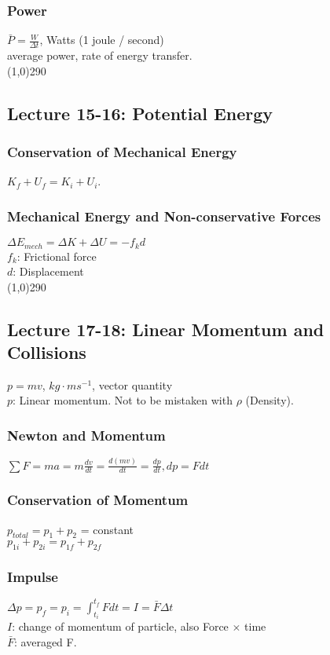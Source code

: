 \documentclass[10 pt]{article}
\begin{document}
\begin{multicols}{2}
\subsubsection*{Power}
$\displaystyle \bar P = \frac{W}{\Delta t}$, Watts (1 joule / second) \\
average power, rate of energy transfer.\\
\line(1,0){290}
\subsection*{Lecture 15-16: Potential Energy}
\subsubsection*{Conservation of Mechanical Energy}
$K_f + U_f = K_i + U_i$.
\subsubsection*{Mechanical Energy and Non-conservative Forces}
$\Delta E_{mech} = \Delta K + \Delta U = -f_kd$ \\
$f_k$: Frictional force\\
$d$: Displacement \\
\line(1,0){290}
\subsection*{Lecture 17-18: Linear Momentum and Collisions}
$p = mv$, $kg \cdot ms^{-1}$, vector quantity \\
$p$: Linear momentum. Not to be mistaken with $\rho$ (Density).
\subsubsection*{Newton and Momentum}
$\displaystyle \sum F = ma = m\frac{dv}{dt} = \frac{d(mv)}{dt} = \frac{dp}{dt}, dp = Fdt$
\subsubsection*{Conservation of Momentum}
$p_{total} = p_1 + p_2$ = constant \\
\indent $p_{1i} + p_{2i} = p_{1f} + p_{2f}$
\subsubsection*{Impulse}
$\displaystyle \Delta p = p_f = p_i = \int_{t_i}^{t_f} Fdt = I = \bar F \Delta t$ \\
$I$: change of momentum of particle, also Force $\times$ time \\
$\bar F$: averaged F.

\end{multicols}
\end{document}
